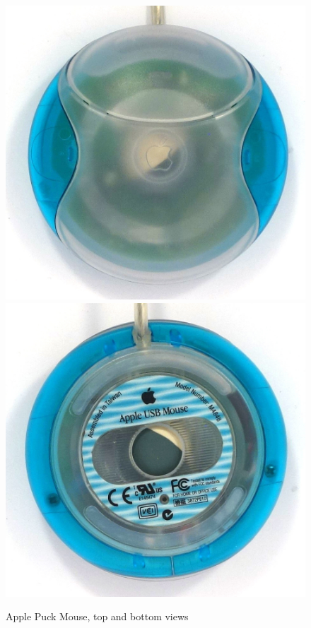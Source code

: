 \documentclass[11pt, a4paper]{article}
\begin{document}
\begin{figure}[h]
    \centering
    \includegraphics[scale=0.65]{1998_apple_puck/appleup60.jpg}
    \includegraphics[scale=0.65]{1998_apple_puck/appledown60.jpg}
    \caption{Apple Puck Mouse, top and bottom views}
    \label{fig:top}
\end{figure}
\end{document}
